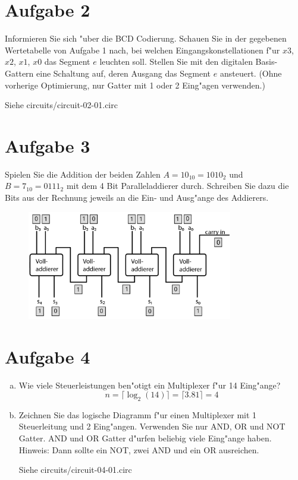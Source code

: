 \documentclass[10pt, oneside]{article}
\begin{document}
\pagebreak

\section{Aufgabe 2}

Informieren Sie sich "uber die BCD Codierung. Schauen Sie in der gegebenen
Wertetabelle von Aufgabe 1 nach, bei welchen Eingangskonstellationen f"ur $x3$,
$x2$, $x1$, $x0$ das Segment $e$ leuchten soll. Stellen Sie mit den digitalen
Basis-Gattern eine Schaltung auf, deren Ausgang das Segment $e$ ansteuert.
(Ohne vorherige Optimierung, nur Gatter mit 1 oder 2 Eing"agen verwenden.)

Siehe circuits/circuit-02-01.circ

\section{Aufgabe 3}

Spielen Sie die Addition der beiden Zahlen $A = 10_10 = 1010_2$ und $B = 7_10 =
0111_2$ mit dem 4 Bit Paralleladdierer durch. Schreiben Sie dazu die Bits aus
der Rechnung jeweils an die Ein- und Ausg"ange des Addierers.

\vspace{5pt}

\begin{figure}[h]
    \centering
    \includegraphics[width=0.8\textwidth]{./assets/abbildung-03-01.png}
    \caption{}
\end{figure}

\section{Aufgabe 4}

\begin{enumerate}[(a)]
    \item Wie viele Steuerleistungen ben"otigt ein Multiplexer f"ur 14 Eing"ange?
        \begin{equation*}
            n = {\lceil}{\log}_2(14){\rceil} = {\lceil}3.81{\rceil} = 4
        \end{equation*}

    \item Zeichnen Sie das logische Diagramm f"ur einen Multiplexer mit 1
        Steuerleitung und 2 Eing"angen. Verwenden Sie nur AND, OR und NOT
        Gatter. AND und OR Gatter d"urfen beliebig viele Eing"ange haben.
        Hinweis: Dann sollte ein NOT, zwei AND und ein OR ausreichen.

        Siehe circuits/circuit-04-01.circ
\end{enumerate}
\end{document}
